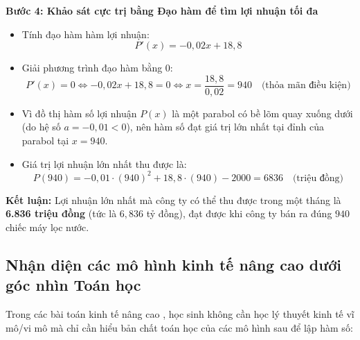 \documentclass[12pt]{article}
\begin{document}
\begin{loigiai}
		\vspace{2mm}
		\textbf{Bước 4: Khảo sát cực trị bằng Đạo hàm để tìm lợi nhuận tối đa}
		\begin{itemize}
			\item Tính đạo hàm hàm lợi nhuận:
			\[ P'(x) = -0,02x + 18,8 \]
			\item Giải phương trình đạo hàm bằng 0:
			\[ P'(x) = 0 \Leftrightarrow -0,02x + 18,8 = 0 \Leftrightarrow x = \frac{18,8}{0,02} = 940 \quad \text{(thỏa mãn điều kiện)} \]
			\item Vì đồ thị hàm số lợi nhuận $P(x)$ là một parabol có bề lõm quay xuống dưới (do hệ số $a = -0,01 < 0$), nên hàm số đạt giá trị lớn nhất tại đỉnh của parabol tại $x = 940$.
			\item Giá trị lợi nhuận lớn nhất thu được là:
			\[ P(940) = -0,01 \cdot (940)^2 + 18,8 \cdot (940) - 2000 = 6836 \quad \text{(triệu đồng)} \]
		\end{itemize}
		
		\textbf{Kết luận:} Lợi nhuận lớn nhất mà công ty có thể thu được trong một tháng là \textbf{6.836 triệu đồng} (tức là $6,836$ tỷ đồng), đạt được khi công ty bán ra đúng $940$ chiếc máy lọc nước.
	\end{loigiai}
	
	
	\subsection{Nhận diện các mô hình kinh tế nâng cao dưới góc nhìn Toán học}
	
	Trong các bài toán kinh tế nâng cao , học sinh không cần học lý thuyết kinh tế vĩ mô/vi mô mà chỉ cần hiểu bản chất toán học của các mô hình sau để lập hàm số:
	
\end{document}

